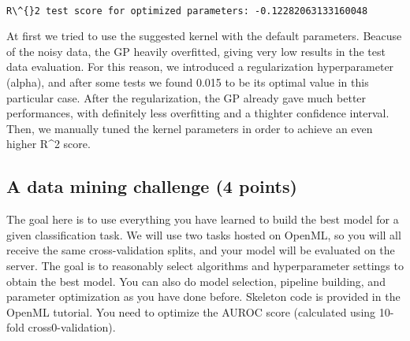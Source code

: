 \documentclass[11pt]{article}
\begin{document}
    \begin{center}
    \end{center}
    { \hspace*{\fill} \\}
    
    \begin{Verbatim}[commandchars=\\\{\}]
R\^{}2 test score for optimized parameters: -0.12282063133160048

    \end{Verbatim}

    At first we tried to use the suggested kernel with the default
parameters. Beacuse of the noisy data, the GP heavily overfitted, giving
very low results in the test data evaluation. For this reason, we
introduced a regularization hyperparameter (alpha), and after some tests
we found 0.015 to be its optimal value in this particular case. After
the regularization, the GP already gave much better performances, with
definitely less overfitting and a thighter confidence interval. Then, we
manually tuned the kernel parameters in order to achieve an even higher
R\^{}2 score.

    \subsection{A data mining challenge (4
points)}\label{a-data-mining-challenge-4-points}

    The goal here is to use everything you have learned to build the best
model for a given classification task. We will use two tasks hosted on
OpenML, so you will all receive the same cross-validation splits, and
your model will be evaluated on the server. The goal is to reasonably
select algorithms and hyperparameter settings to obtain the best model.
You can also do model selection, pipeline building, and parameter
optimization as you have done before. Skeleton code is provided in the
OpenML tutorial. You need to optimize the AUROC score (calculated using
10-fold cross0-validation).
\end{document}
